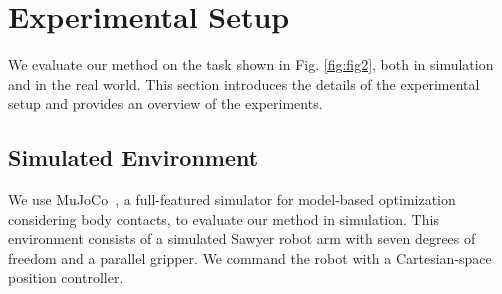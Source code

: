 \section{Experimental Setup}\label{sec:experiments}

We evaluate our method on the task shown in Fig. \ref{fig:fig2}, both in simulation and in the real world. This section introduces the details of the experimental setup and provides an overview of the experiments.

\subsection{Simulated Environment}
We use MuJoCo~\citep{todorov12mujoco}, a full-featured simulator for model-based optimization considering body contacts, to evaluate our method in simulation.
This environment consists of a simulated Sawyer robot arm with seven degrees of freedom and a parallel gripper. 
We command the robot with a Cartesian-space position controller.



